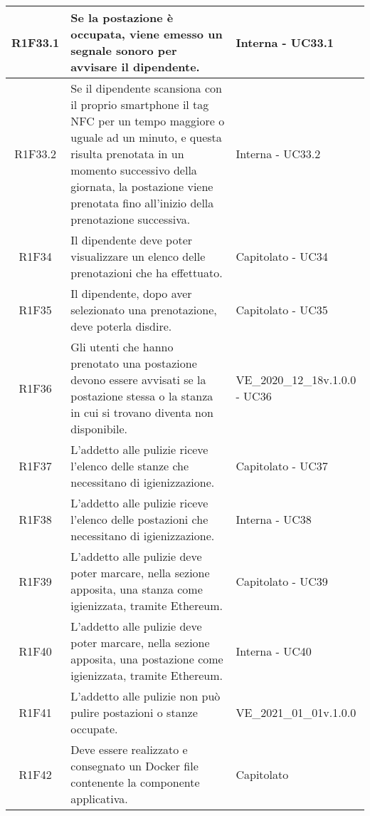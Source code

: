 \begin{center}
\begin{longtable}{|c|p{10cm}|p{4cm}|}
		\hline
		R1F33.1&Se la postazione è occupata, viene emesso un segnale sonoro per avvisare il dipendente.	& Interna - UC33.1	\\
		\hline
		R1F33.2&Se il dipendente scansiona con il proprio smartphone il tag NFC per un tempo maggiore o uguale ad un minuto, e questa risulta prenotata in un momento successivo della giornata, la postazione viene prenotata fino all'inizio della prenotazione successiva.	&Interna - UC33.2 	\\
		\hline	
		R1F34&Il dipendente deve poter visualizzare un elenco delle prenotazioni che ha effettuato. & Capitolato - UC34	\\
		\hline
		R1F35&Il dipendente, dopo aver selezionato una prenotazione, deve poterla disdire.	&Capitolato - UC35 	\\
		\hline
		R1F36&Gli utenti che hanno prenotato una postazione devono essere avvisati se la postazione stessa o la stanza in cui si trovano diventa non disponibile.	& VE\_2020\_12\_18v.1.0.0 - UC36	\\
		\hline

		R1F37&	L'addetto alle pulizie riceve l'elenco delle stanze che necessitano di igienizzazione.& 	Capitolato - UC37\\
		\hline
		R1F38&L'addetto alle pulizie riceve l'elenco delle postazioni che necessitano di igienizzazione.	& Interna - UC38	\\
		\hline
		R1F39&L'addetto alle pulizie deve poter marcare, nella sezione apposita, una stanza come igienizzata, tramite Ethereum.	& Capitolato - UC39	\\
		\hline
		R1F40&L'addetto alle pulizie deve poter marcare, nella sezione apposita, una postazione come igienizzata, tramite Ethereum.	&Interna - UC40 	\\
		\hline
		R1F41&L'addetto alle pulizie non può pulire postazioni o stanze occupate.	& VE\_2021\_01\_01v.1.0.0	\\
		\hline
		R1F42 &Deve essere realizzato e consegnato un Docker file contenente la componente applicativa. & Capitolato\\
		\hline
						
	\end{longtable}
\end{center}


